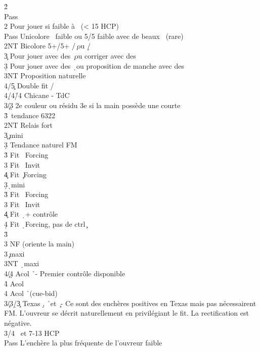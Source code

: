 \documentclass[a4paper]{article}
\begin{document}
\begin{bidtable}
2\h\+\\
Pass\\
2\s \> Pour jouer si faible à \s\ (< 15 HCP)\+\\
Pass \> Unicolore \s\ faible ou 5/5 faible avec de beaux \s\ (rare)\\
2NT \> Bicolore 5+/5+ \s /\c\ ou \s /\d \+\\
3\c \> Pour jouer avec des \c\ ou corriger avec des \d \\
3\d \> Pour jouer avec des \d\ ou proposition de manche avec des \c \\
3NT \> Proposition naturelle\\
4/5\c \> Double fit \s /\c \\
4\d/4\h/4\s \> Chicane - TdC\-\\
3\c/3\d \> 2e couleur ou résidu 3e si la main possède une courte\\
3\h {}\s\ tendance 6322\-\\
2NT \> Relais fort\+\\
3\c {}\c\ mini\+\\
3\d \> Tendance naturel FM\\
3\h \> Fit \s\ Forcing\\
3\s \> Fit \s\ Invit\\
4\c \> Fit \c\ Forcing\-\\
3\d {}\d\ mini\+\\
3\h \> Fit \s\ Forcing\\
3\s \> Fit \s\ Invit\\
4\c \> Fit \d\ + contrôle \c \\
4\d \> Fit \d\ Forcing, pas de ctrl \c \-\\
3\h {}\s \+\\
3\s \> NF (oriente la main)\-\\
3\s {}\c\ maxi\\
3NT \d\ maxi\\
4\c/4\d \> Acol \h\ - Premier contrôle disponible\\
4\h \> Acol \h \\
4\s \> Acol \h\ (cue-bid)\-\\
3\c/3\d/3\c \> Texas \d , \h\ et \c\ - Ce sont des enchères positives en Texas mais pas nécessairent FM. L'ouvreur se décrit naturellement en privilégiant le fit. La rectification est négative.\\
3\s {}/4 \s\ et 7-13 HCP\+\\
Pass \> L'enchère la plus fréquente de l'ouvreur faible\\

\end{bidtable}
\end{document}
